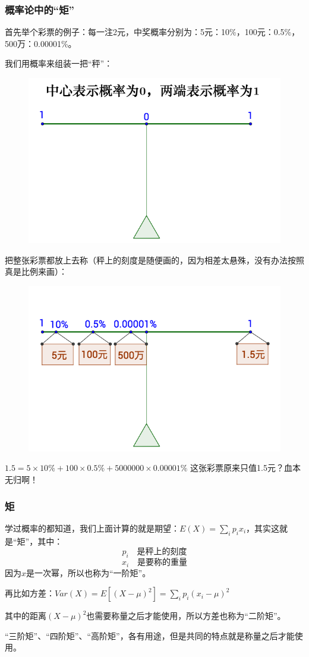 \documentclass[12pt]{article}
\begin{document}
\subsubsection{概率论中的“矩”}
首先举个彩票的例子：每一注2元，中奖概率分别为：5元：10\%，100元：0.5\%，500万：0.00001\%。

我们用概率来组装一把“秤”：
\begin{figure}[H]
  \centering
  \includegraphics[width=.5\textwidth]{fig/MomentInLottery.png} 
\end{figure}
把整张彩票都放上去称（秤上的刻度是随便画的，因为相差太悬殊，没有办法按照真是比例来画）：
\begin{figure}[H]
  \centering
  \includegraphics[width=.5\textwidth]{fig/MomentInLottery2.png} 
\end{figure}
$1.5=5\times10\%+100\times0.5\%+5000000\times0.00001\%$ 这张彩票原来只值1.5元？血本无归啊！

\subsubsection{矩}
学过概率的都知道，我们上面计算的就是期望：$E(X) = \sum_ip_ix_i$，其实这就是“矩”，其中：
$$
p_i \quad \textbf{是秤上的刻度}
$$
$$
x_i \quad \textbf{是要称的重量}
$$
因为$x$是一次幂，所以也称为“一阶矩”。

再比如方差：$Var(X) = E[(X-\mu)^2] = \sum_ip_i(x_i-\mu)^2 $

其中的距离$(X-\mu)^2$也需要称量之后才能使用，所以方差也称为“二阶矩”。

“三阶矩”、“四阶矩”、“高阶矩”，各有用途，但是共同的特点就是称量之后才能使用。
\end{document}
